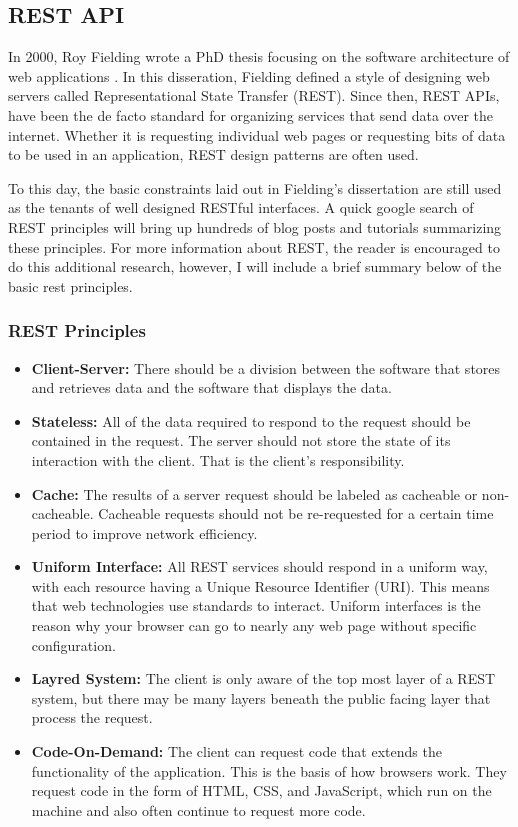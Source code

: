 \subsection{REST API}
In 2000, Roy Fielding wrote a PhD thesis focusing on the software architecture of web applications \cite{fieldingArchitecturalStylesDesign2000}.  In this disseration, Fielding defined a style of designing web servers called Representational State Transfer (REST).  Since then, REST APIs, have been the de facto standard for organizing services that send data over the internet.  Whether it is requesting individual web pages or requesting bits of data to be used in an application, REST design patterns are often used. 

To this day, the basic constraints laid out in Fielding's dissertation are still used as the tenants of well designed RESTful interfaces.  A quick google search of REST principles will bring up hundreds of blog posts and tutorials summarizing these principles. For more information about REST, the reader is encouraged to do this additional research, however, I will include a brief summary below of the basic rest principles.

\subsubsection{REST Principles}

\begin{itemize}
    \item \textbf{Client-Server:} There should be a division between the software that stores and retrieves data and the software that displays the data.
    \item \textbf{Stateless:} All of the data required to respond to the request should be contained in the request. The server should not store the state of its interaction with the client. That is the client's responsibility.
    \item \textbf{Cache:} The results of a server request should be labeled as cacheable or non-cacheable.  Cacheable requests should not be re-requested for a certain time period to improve network efficiency.
    \item \textbf{Uniform Interface:} All REST services should respond in a uniform way, with each resource having a Unique Resource Identifier (URI).  This means that web technologies use standards to interact.  Uniform interfaces is the reason why your browser can go to nearly any web page without specific configuration.
    \item \textbf{Layred System:} The client is only aware of the top most layer of a REST system, but there may be many layers beneath the public facing layer that process the request.
    \item \textbf{Code-On-Demand:} The client can request code that extends the functionality of the application.  This is the basis of how browsers work.  They request code in the form of HTML, CSS, and JavaScript, which run on the machine and also often continue to request more code.
\end{itemize}

